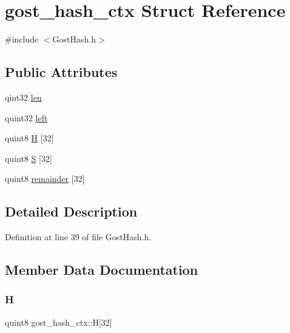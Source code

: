 \hypertarget{structgost__hash__ctx}{}\section{gost\+\_\+hash\+\_\+ctx Struct Reference}
\label{structgost__hash__ctx}


{\ttfamily \#include $<$Gost\+Hash.\+h$>$}

\subsection*{Public Attributes}
\begin{DoxyCompactItemize}
\item 
qint32 \hyperlink{structgost__hash__ctx_ae8548a1a59e28025df62641a524027f0}{len}
\item 
quint32 \hyperlink{structgost__hash__ctx_a9cce4ab415de16b79763ce40d78ad755}{left}
\item 
quint8 \hyperlink{structgost__hash__ctx_ac5bff4e29faa513ab9fdfe5e05694421}{H} \mbox{[}32\mbox{]}
\item 
quint8 \hyperlink{structgost__hash__ctx_aa1216c9e2af0262da341e420eeb89e51}{S} \mbox{[}32\mbox{]}
\item 
quint8 \hyperlink{structgost__hash__ctx_af6eb15c486c0155a5d6ffba7fbabb317}{remainder} \mbox{[}32\mbox{]}
\end{DoxyCompactItemize}


\subsection{Detailed Description}


Definition at line 39 of file Gost\+Hash.\+h.



\subsection{Member Data Documentation}
\mbox{\label{structgost__hash__ctx_ac5bff4e29faa513ab9fdfe5e05694421}} 
\subsubsection{\texorpdfstring{H}{H}}
{\footnotesize\ttfamily quint8 gost\+\_\+hash\+\_\+ctx\+::H\mbox{[}32\mbox{]}}



